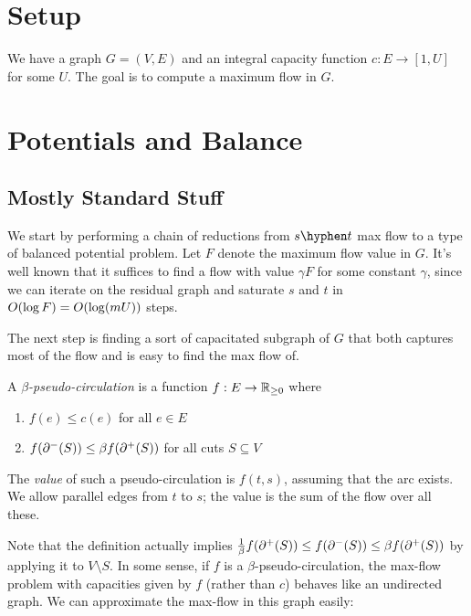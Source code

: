 \documentclass[12pt]{article}
\begin{document}
\section{Setup}

We have a graph $G = (V, E)$ and an integral capacity function
$c : E \to [1, U]$ for some $U$. The goal is to compute a maximum flow in $G$.

\section{Potentials and Balance}

\subsection{Mostly Standard Stuff}

We start by performing a chain of reductions from $s \hyphen t$ max flow to a
type of balanced potential problem. Let $F$ denote the maximum flow value in
$G$. It's well known that it suffices to find a flow with value $\gamma F$ for
some constant $\gamma$, since we can iterate on the residual graph and saturate
$s$ and $t$ in $\bigO{\log F} = \bigO{\log(mU)}$ steps.

The next step is finding a sort of capacitated subgraph of $G$ that both
captures most of the flow and is easy to find the max flow of.

\begin{definition}
  A \emph{$\beta$-pseudo-circulation} is a function $f : E \to \mathbb{R}_{\geq 0}$
  where
  \begin{enumerate}
    \item $f(e) \leq c(e)$ for all $e \in E$
    \item $f(\incut{S}) \leq \beta f(\outcut{S})$ for all cuts $S \subseteq V$
  \end{enumerate}
  The \emph{value} of such a pseudo-circulation is $f(t, s)$, assuming that the
  arc exists. We allow parallel edges from $t$ to $s$; the value is the sum of
  the flow over all these.
\end{definition}

Note that the definition actually implies
$\frac{1}{\beta}f(\outcut{S}) \leq f(\incut{S}) \leq \beta f(\outcut{S})$ by
applying it to $V \setminus S$. In some sense, if $f$ is a
$\beta$-pseudo-circulation, the max-flow problem with capacities given by $f$
(rather than $c$) behaves like an undirected graph. We can approximate the
max-flow in this graph easily:
\end{document}
